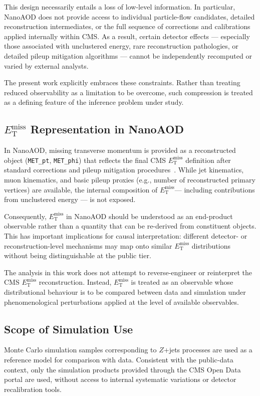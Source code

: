 \documentclass[a4paper,11pt]{article}
\newcommand{\MET}{\ensuremath{E_{\mathrm{T}}^{\mathrm{miss}}}\xspace}
\begin{document}
This design necessarily entails a loss of low-level information.
In particular, NanoAOD does not provide access to individual particle-flow
candidates, detailed reconstruction intermediates, or the full sequence of
corrections and calibrations applied internally within CMS.
As a result, certain detector effects --- especially those associated with
unclustered energy, rare reconstruction pathologies, or detailed pileup
mitigation algorithms --- cannot be independently recomputed or varied by
external analysts.

The present work explicitly embraces these constraints.
Rather than treating reduced observability as a limitation to be overcome,
such compression is treated as a defining feature of the inference problem
under study.

\subsection{\texorpdfstring{\MET}{MET} Representation in NanoAOD}

In NanoAOD, missing transverse momentum is provided as a reconstructed object
(\texttt{MET\_pt}, \texttt{MET\_phi}) that reflects the final CMS \MET
definition after standard corrections and pileup mitigation procedures~\cite{CMS:MET2019}.
While jet kinematics, muon kinematics, and basic pileup proxies (e.g.,
number of reconstructed primary vertices) are available, the internal
composition of \MET --- including contributions from unclustered energy ---
is not exposed.

Consequently, \MET in NanoAOD should be understood as an end-product
observable rather than a quantity that can be re-derived from constituent
objects.
This has important implications for causal interpretation: different
detector- or reconstruction-level mechanisms may map onto similar \MET
distributions without being distinguishable at the public tier.

The analysis in this work does not attempt to reverse-engineer or
reinterpret the CMS \MET reconstruction.
Instead, \MET is treated as an observable whose distributional behaviour is
to be compared between data and simulation under phenomenological
perturbations applied at the level of available observables.

\subsection{Scope of Simulation Use}

Monte Carlo simulation samples corresponding to $Z$+jets processes are used
as a reference model for comparison with data.
Consistent with the public-data context, only the simulation products
provided through the CMS Open Data portal are used, without access to
internal systematic variations or detector recalibration tools.
\end{document}
